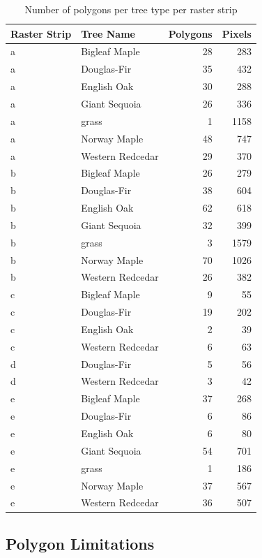 \documentclass[12pt,twoside]{reedthesis}
\begin{document}
\begin{table}

\caption{\label{tab:polyCountsTrees}Number of polygons per tree type per raster strip}
\centering
\begin{tabular}[t]{l|l|r|r}
\hline
Raster Strip & Tree Name & Polygons & Pixels\\
\hline
a & Bigleaf Maple & 28 & 283\\
\hline
a & Douglas-Fir & 35 & 432\\
\hline
a & English Oak & 30 & 288\\
\hline
a & Giant Sequoia & 26 & 336\\
\hline
a & grass & 1 & 1158\\
\hline
a & Norway Maple & 48 & 747\\
\hline
a & Western Redcedar & 29 & 370\\
\hline
b & Bigleaf Maple & 26 & 279\\
\hline
b & Douglas-Fir & 38 & 604\\
\hline
b & English Oak & 62 & 618\\
\hline
b & Giant Sequoia & 32 & 399\\
\hline
b & grass & 3 & 1579\\
\hline
b & Norway Maple & 70 & 1026\\
\hline
b & Western Redcedar & 26 & 382\\
\hline
c & Bigleaf Maple & 9 & 55\\
\hline
c & Douglas-Fir & 19 & 202\\
\hline
c & English Oak & 2 & 39\\
\hline
c & Western Redcedar & 6 & 63\\
\hline
d & Douglas-Fir & 5 & 56\\
\hline
d & Western Redcedar & 3 & 42\\
\hline
e & Bigleaf Maple & 37 & 268\\
\hline
e & Douglas-Fir & 6 & 86\\
\hline
e & English Oak & 6 & 80\\
\hline
e & Giant Sequoia & 54 & 701\\
\hline
e & grass & 1 & 186\\
\hline
e & Norway Maple & 37 & 567\\
\hline
e & Western Redcedar & 36 & 507\\
\hline
\end{tabular}
\end{table}
\hypertarget{polygon-limitations}{%
\subsection{Polygon Limitations}\label{polygon-limitations}}
\end{document}
